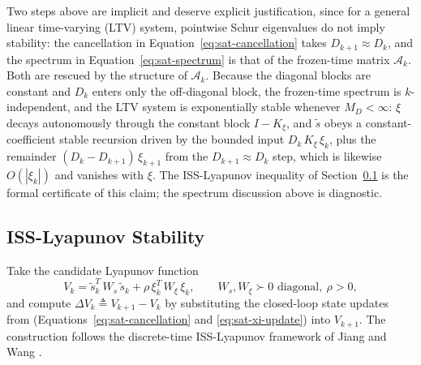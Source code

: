 \documentclass[conf]{new-aiaa}
\begin{document}
Two steps above are implicit and deserve explicit justification, since for a general linear time-varying (LTV) system, pointwise Schur eigenvalues do not imply stability: the cancellation in Equation~\ref{eq:sat-cancellation} takes $D_{k+1} \approx D_k$, and the spectrum in Equation~\ref{eq:sat-spectrum} is that of the frozen-time matrix $\mathcal{A}_k$. Both are rescued by the structure of $\mathcal{A}_k$. Because the diagonal blocks are constant and $D_k$ enters only the off-diagonal block, the frozen-time spectrum is $k$-independent, and the LTV system is exponentially stable whenever $M_D < \infty$: $\xi$ decays autonomously through the constant block $I - K_\xi$, and $\tilde s$ obeys a constant-coefficient stable recursion driven by the bounded input $D_k\, K_\xi\, \xi_k$, plus the remainder $(D_k - D_{k+1})\, \xi_{k+1}$ from the $D_{k+1} \approx D_k$ step, which is likewise $O(|\xi_k|)$ and vanishes with $\xi$. The ISS-Lyapunov inequality of Section~\ref{sec:sat-iss} is the formal certificate of this claim; the spectrum discussion above is diagnostic.

\subsection{ISS-Lyapunov Stability}
\label{sec:sat-iss}

Take the candidate Lyapunov function
\small
\begin{equation}
\label{eq:sat-lyap}
V_k = \tilde s_k^T\, W_s\, \tilde s_k + \rho\, \xi_k^T\, W_\xi\, \xi_k,
\qquad W_s, W_\xi \succ 0 \text{ diagonal},\ \rho > 0,
\end{equation}
\normalsize
and compute $\Delta V_k \triangleq V_{k+1} - V_k$ by substituting the closed-loop state updates from (Equations~\ref{eq:sat-cancellation} and \ref{eq:sat-xi-update}) into $V_{k+1}$. The construction follows the discrete-time ISS-Lyapunov framework of Jiang and Wang \cite{refs:JiangWang2001}.
\end{document}
